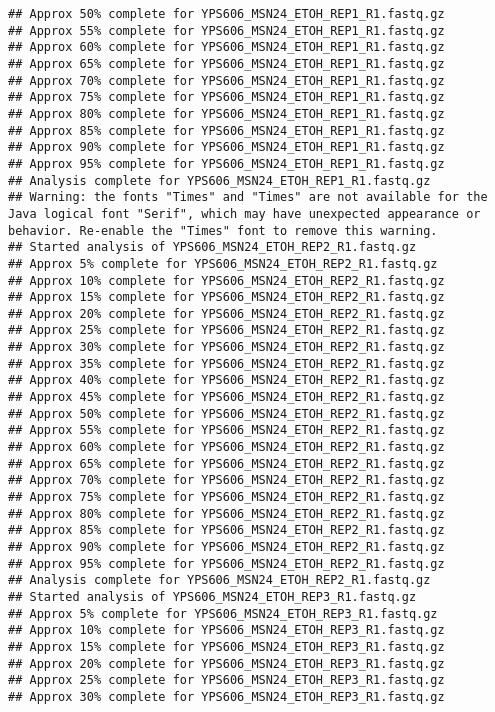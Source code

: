 \documentclass[
]{book}
\begin{document}
\begin{verbatim}
## Approx 50% complete for YPS606_MSN24_ETOH_REP1_R1.fastq.gz
## Approx 55% complete for YPS606_MSN24_ETOH_REP1_R1.fastq.gz
## Approx 60% complete for YPS606_MSN24_ETOH_REP1_R1.fastq.gz
## Approx 65% complete for YPS606_MSN24_ETOH_REP1_R1.fastq.gz
## Approx 70% complete for YPS606_MSN24_ETOH_REP1_R1.fastq.gz
## Approx 75% complete for YPS606_MSN24_ETOH_REP1_R1.fastq.gz
## Approx 80% complete for YPS606_MSN24_ETOH_REP1_R1.fastq.gz
## Approx 85% complete for YPS606_MSN24_ETOH_REP1_R1.fastq.gz
## Approx 90% complete for YPS606_MSN24_ETOH_REP1_R1.fastq.gz
## Approx 95% complete for YPS606_MSN24_ETOH_REP1_R1.fastq.gz
## Analysis complete for YPS606_MSN24_ETOH_REP1_R1.fastq.gz
## Warning: the fonts "Times" and "Times" are not available for the Java logical font "Serif", which may have unexpected appearance or behavior. Re-enable the "Times" font to remove this warning.
## Started analysis of YPS606_MSN24_ETOH_REP2_R1.fastq.gz
## Approx 5% complete for YPS606_MSN24_ETOH_REP2_R1.fastq.gz
## Approx 10% complete for YPS606_MSN24_ETOH_REP2_R1.fastq.gz
## Approx 15% complete for YPS606_MSN24_ETOH_REP2_R1.fastq.gz
## Approx 20% complete for YPS606_MSN24_ETOH_REP2_R1.fastq.gz
## Approx 25% complete for YPS606_MSN24_ETOH_REP2_R1.fastq.gz
## Approx 30% complete for YPS606_MSN24_ETOH_REP2_R1.fastq.gz
## Approx 35% complete for YPS606_MSN24_ETOH_REP2_R1.fastq.gz
## Approx 40% complete for YPS606_MSN24_ETOH_REP2_R1.fastq.gz
## Approx 45% complete for YPS606_MSN24_ETOH_REP2_R1.fastq.gz
## Approx 50% complete for YPS606_MSN24_ETOH_REP2_R1.fastq.gz
## Approx 55% complete for YPS606_MSN24_ETOH_REP2_R1.fastq.gz
## Approx 60% complete for YPS606_MSN24_ETOH_REP2_R1.fastq.gz
## Approx 65% complete for YPS606_MSN24_ETOH_REP2_R1.fastq.gz
## Approx 70% complete for YPS606_MSN24_ETOH_REP2_R1.fastq.gz
## Approx 75% complete for YPS606_MSN24_ETOH_REP2_R1.fastq.gz
## Approx 80% complete for YPS606_MSN24_ETOH_REP2_R1.fastq.gz
## Approx 85% complete for YPS606_MSN24_ETOH_REP2_R1.fastq.gz
## Approx 90% complete for YPS606_MSN24_ETOH_REP2_R1.fastq.gz
## Approx 95% complete for YPS606_MSN24_ETOH_REP2_R1.fastq.gz
## Analysis complete for YPS606_MSN24_ETOH_REP2_R1.fastq.gz
## Started analysis of YPS606_MSN24_ETOH_REP3_R1.fastq.gz
## Approx 5% complete for YPS606_MSN24_ETOH_REP3_R1.fastq.gz
## Approx 10% complete for YPS606_MSN24_ETOH_REP3_R1.fastq.gz
## Approx 15% complete for YPS606_MSN24_ETOH_REP3_R1.fastq.gz
## Approx 20% complete for YPS606_MSN24_ETOH_REP3_R1.fastq.gz
## Approx 25% complete for YPS606_MSN24_ETOH_REP3_R1.fastq.gz
## Approx 30% complete for YPS606_MSN24_ETOH_REP3_R1.fastq.gz

\end{verbatim}
\end{document}

